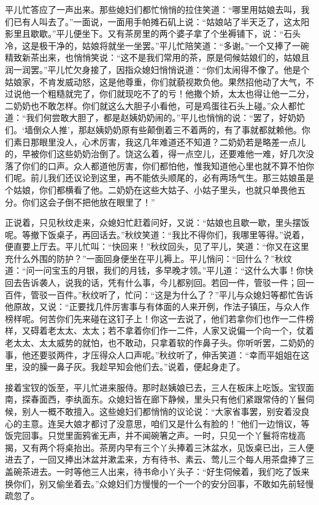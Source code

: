 \documentclass[12pt,oneside]{book}
\begin{document}
平儿忙答应了一声出来。那些媳妇们都忙悄悄的拉住笑道：“哪里用姑娘去叫，我们已有人叫去了。”一面说，一面用手帕摊石矶上说：“姑娘站了半天乏了，这太阳影里且歇歇。”平儿便坐下。又有茶房里的两个婆子拿了个坐褥铺下，说：“石头冷，这是极干净的，姑娘将就坐一坐罢。”平儿忙陪笑道：“多谢。”一个又捧了一碗精致新茶出来，也悄悄笑说：“这不是我们常用的茶，原是伺候姑娘们的，姑娘且润一润罢。”平儿忙欠身接了，因指众媳妇悄悄说道：“你们太闹得不像了。他是个姑娘家，不肯发威动怒，这是他尊重，你们就藐视欺负他。果然招他动了大气，不过说他一个粗糙就完了，你们就现吃不了的亏！他撒个娇，太太也得让他一二分，二奶奶也不敢怎样。你们就这么大胆子小看他，可是鸡蛋往石头上碰。”众人都忙道：“我们何尝敢大胆了，都是赵姨奶奶闹的。”平儿也悄悄的说：“罢了，好奶奶们。‘墙倒众人推’，那赵姨奶奶原有些颠倒着三不着两的，有了事就都就赖他。你们素日那眼里没人，心术厉害，我这几年难道还不知道？二奶奶若是略差一点儿的，早被你们这些奶奶治倒了。饶这么着，得一点空儿，还要难他一难，好几次没落了你们的口声。众人都道他厉害，你们都怕他，惟我知道他心里也就不算不怕你们呢。前儿我们还议论到这里，再不能依头顺尾的，必有两场气生。那三姑娘虽是个姑娘，你们都横看了他。二奶奶在这些大姑子、小姑子里头，也就只单畏他五分。你们这会子倒不把他放在眼里了！”

正说着，只见秋纹走来，众媳妇忙赶着问好，又说：“姑娘也且歇一歇，里头摆饭呢。等撤下饭桌子，再回话去。”秋纹笑道：“我比不得你们，我哪里等得。”说着，便直要上厅去。平儿忙叫：“快回来！”秋纹回头，见了平儿，笑道：“你又在这里充什么外围的防护？”一面回身便坐在平儿褥上。平儿悄问：“回什么？”秋纹道：“问一问宝玉的月银，我们的月钱，多早晚才领。”平儿道：“这什么大事！你快回去告诉袭人，说我的话，凭有什么事，今儿都别回。若回一件，管驳一件；回一百件，管驳一百件。”秋纹听了，忙问：“这是为什么了？”平儿与众媳妇等都忙告诉他原故，又说：“正要找几件厉害事与有体面的人来开例，作法子镇压，与众人作榜样呢。何苦你们先来碰在这钉子上！你这一去说了，他们若拿你们也作一二件榜样，又碍着老太太、太太；若不拿着你们作一二件，人家又说偏一个向一个，仗着老太太、太太威势的就怕，也不敢动，只拿着软的作鼻子头。你听听罢，二奶奶的事，他还要驳两件，才压得众人口声呢。”秋纹听了，伸舌笑道：“幸而平姐姐在这里，没的臊一鼻子灰。我趁早知会他们去。”说着，便起身走了。

接着宝钗的饭至，平儿忙进来服侍。那时赵姨娘已去，三人在板床上吃饭。宝钗面南，探春面西，李纨面东。众媳妇皆在廊下静候，里头只有他们紧跟常侍的丫鬟伺候，别人一概不敢擅入。这些媳妇们都悄悄的议论说：“大家省事罢，别安着没良心的主意。连吴大娘才都讨了没意思，咱们又是什么有脸的！”他们一边悄议，等饭完回事。只觉里面鸦雀无声，并不闻碗箸之声。一时，只见一个丫鬟将帘栊高揭，又有两个将桌抬出。茶房内早有三个丫头捧着三沐盆水，见饭桌已出，三人便进去了，一回又捧出沐盆并漱盂来，方有待书、素云、莺儿三个每人用茶盘捧了三盖碗茶进去。一时等他三人出来，待书命小丫头子：“好生伺候着，我们吃了饭来换你们，别又偷坐着去。”众媳妇们方慢慢的一个一个的安分回事，不敢如先前轻慢疏忽了。
\end{document}
